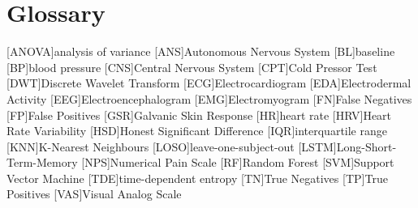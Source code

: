 \chapter{Glossary}

\footnotesize
\SingleSpacing

\begin{acronym}[AAAAAA]

	[ANOVA]{analysis of variance}
	[ANS]{Autonomous Nervous System}
	[BL]{baseline}
	[BP]{blood pressure}
	[CNS]{Central Nervous System}
	[CPT]{Cold Pressor Test}
	[DWT]{Discrete Wavelet Transform}
	[ECG]{Electrocardiogram}
	[EDA]{Electrodermal Activity}
	[EEG]{Electroencephalogram}
	[EMG]{Electromyogram}
	[FN]{False Negatives}
	[FP]{False Positives}
	[GSR]{Galvanic Skin Response}
	[HR]{heart rate}
	[HRV]{Heart Rate Variability}
	[HSD]{Honest Significant Difference}
	[IQR]{interquartile range}
	[KNN]{K-Nearest Neighbours}
	[LOSO]{leave-one-subject-out}
	[LSTM]{Long-Short-Term-Memory}
	[NPS]{Numerical Pain Scale}
	[RF]{Random Forest}
	[SVM]{Support Vector Machine}
	[TDE]{time-dependent entropy}
	[TN]{True Negatives}
	[TP]{True Positives}
	[VAS]{Visual Analog Scale}


\end{acronym}

